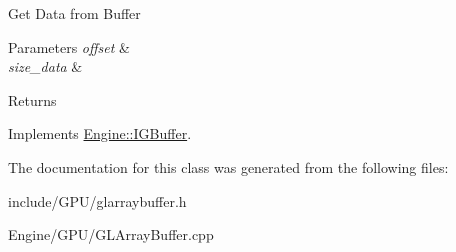 Get Data from Buffer 
\begin{DoxyParams}{Parameters}
{\em offset} & \\
\hline
{\em size\+\_\+data} & \\
\hline
\end{DoxyParams}
\begin{DoxyReturn}{Returns}

\end{DoxyReturn}


Implements \hyperlink{classEngine_1_1IGBuffer_a8ad52dc670797d72aabf99033d20b220}{Engine\+::\+I\+G\+Buffer}.



The documentation for this class was generated from the following files\+:\begin{DoxyCompactItemize}
\item 
include/\+G\+P\+U/glarraybuffer.\+h\item 
Engine/\+G\+P\+U/G\+L\+Array\+Buffer.\+cpp\end{DoxyCompactItemize}
